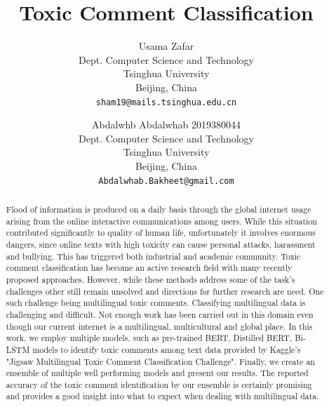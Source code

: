 \documentclass[10pt,twocolumn,letterpaper]{article}
\begin{document}
\title{ Toxic Comment Classification }

\author{Usama Zafar\\
Dept. Computer Science and Technology\\
Tsinghua University \\
Beijing, China\\
{\tt\small sham19@mails.tsinghua.edu.cn}
\and
Abdalwhb Abdalwhab 2019380044\\
Dept. Computer Science and Technology\\
Tsinghua University \\
Beijing, China\\
{\tt\small Abdalwhab.Bakheet@gmail.com}
}

\maketitle

\begin{abstract}

Flood of information is produced on a daily basis through the global internet usage arising from the online interactive communications among users. While this situation contributed significantly to quality of human life, unfortunately it involves enormous dangers, since online texts with high toxicity can cause personal attacks, harassment and bullying. This has triggered both industrial and academic community. Toxic comment classification has become an active research field with many recently proposed approaches. However, while these methods address some of the task's challenges other still remain unsolved and directions for further research are need. One such challenge being multilingual toxic comments. Classifying multilingual data is challenging and difficult. Not enough work has been carried out in this domain even though our current internet is a multilingual, multicultural and global place. In this work, we employ multiple models, such as pre-trained BERT, Distilled BERT, Bi-LSTM models to identify toxic comments among text data provided by Kaggle's "Jigsaw Multilingual Toxic Comment Classification Challenge". Finally, we create an ensemble of multiple well performing models and present our results. The reported accuracy of the toxic comment identification by our ensemble is certainly promising and provides a good insight into what to expect when dealing with multilingual data.

\end{abstract}
\end{document}
